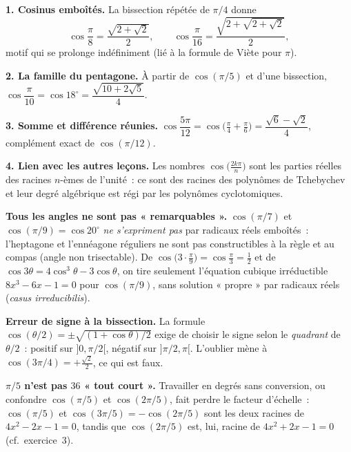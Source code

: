 \decsep{}



\begin{mdframed}[style=exbar]
  \textbf{1. Cosinus emboîtés.}
  La bissection répétée de $\pi/4$ donne
  \[
    \cos\frac{\pi}{8}=\frac{\sqrt{2+\sqrt2}}{2},\qquad
    \cos\frac{\pi}{16}=\frac{\sqrt{2+\sqrt{2+\sqrt2}}}{2},
  \]
  motif qui se prolonge indéfiniment (lié à la formule de Viète pour $\pi$).

  \smallskip\noindent
  \textbf{2. La famille du pentagone.}
  À partir de $\cos(\pi/5)$ et d'une bissection,
  $\cos\dfrac{\pi}{10}=\cos 18^\circ=\dfrac{\sqrt{10+2\sqrt5}}{4}$.

  \smallskip\noindent
  \textbf{3. Somme et différence réunies.}
  $\cos\dfrac{5\pi}{12}=\cos\!\big(\tfrac{\pi}{4}+\tfrac{\pi}{6}\big)
   =\dfrac{\sqrt6-\sqrt2}{4}$, complément exact de $\cos(\pi/12)$.

  \smallskip\noindent
  \textbf{4. Lien avec les autres leçons.}
  Les nombres $\cos\!\big(\tfrac{2k\pi}{n}\big)$ sont les parties réelles des
  racines $n$-èmes de l'unité~: ce sont des racines des polynômes de
  Tchebychev et leur degré algébrique est régi par les polynômes cyclotomiques.
\end{mdframed}

\vspace{6pt}

\begin{mdframed}[style=cexbar]
  \textbf{Tous les angles ne sont pas « remarquables ».}\enspace%
  $\cos(\pi/7)$ et $\cos(\pi/9)=\cos 20^\circ$ \emph{ne s'expriment pas} par
  radicaux réels emboîtés~: l'heptagone et l'ennéagone réguliers ne sont pas
  constructibles à la règle et au compas (angle non trisectable). De
  $\cos\!\big(3\cdot\tfrac{\pi}{9}\big)=\cos\tfrac{\pi}{3}=\tfrac12$ et de
  $\cos 3\theta=4\cos^3\theta-3\cos\theta$, on tire seulement l'équation
  cubique irréductible $8x^3-6x-1=0$ pour $\cos(\pi/9)$, sans solution
  « propre » par radicaux réels (\textit{casus irreducibilis}).

  \smallskip\noindent
  \textbf{Erreur de signe à la bissection.}\enspace%
  La formule $\cos(\theta/2)=\pm\sqrt{(1+\cos\theta)/2}$ exige de choisir le
  signe selon le \emph{quadrant} de $\theta/2$~: positif sur $]0,\pi/2[$,
  négatif sur $]\pi/2,\pi[$. L'oublier mène à $\cos(3\pi/4)=+\tfrac{\sqrt2}{2}$,
  ce qui est faux.

  \smallskip\noindent
  \textbf{$\pi/5$ n'est pas $36$ « tout court ».}\enspace%
  Travailler en degrés sans conversion, ou confondre $\cos(\pi/5)$ et
  $\cos(2\pi/5)$, fait perdre le facteur d'échelle~: $\cos(\pi/5)$ et
  $\cos(3\pi/5)=-\cos(2\pi/5)$ sont les deux racines de $4x^2-2x-1=0$,
  tandis que $\cos(2\pi/5)$ est, lui, racine de $4x^2+2x-1=0$
  (cf.\ exercice~3).
\end{mdframed}

